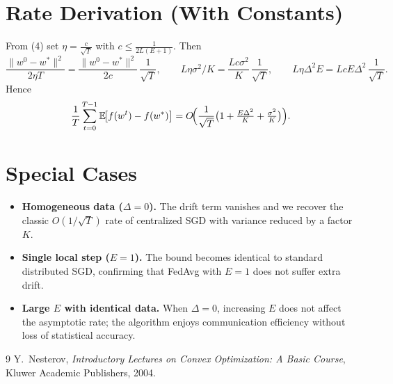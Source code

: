 \documentclass{article}
\newcommand{\E}{\mathbb{E}}
\begin{document}
\section*{Rate Derivation (With Constants)}
From (4) set $\eta = \frac{c}{\sqrt{T}}$ with $c\le \frac{1}{2L(E+1)}$.
Then
\[
\frac{\|w^{0}-w^{*}\|^{2}}{2\eta T}= \frac{\|w^{0}-w^{*}\|^{2}}{2c}\,\frac{1}{\sqrt{T}},\qquad
L\eta\sigma^{2}/K = \frac{Lc\sigma^{2}}{K}\,\frac{1}{\sqrt{T}},\qquad
L\eta\Delta^{2}E = LcE\Delta^{2}\,\frac{1}{\sqrt{T}}.
\]
Hence
\[
\frac{1}{T}\sum_{t=0}^{T-1}\E\!\bigl[f(w^{t})-f(w^{*})\bigr]
= O\!\Bigl(\frac{1}{\sqrt{T}}\bigl(1+\tfrac{E\Delta^{2}}{K}+\tfrac{\sigma^{2}}{K}\bigr)\Bigr).
\]

\section*{Special Cases}
\begin{itemize}[leftmargin=*]
  \item \textbf{Homogeneous data ($\Delta=0$).} The drift term vanishes and we recover the classic $O(1/\sqrt{T})$ rate of centralized SGD with variance reduced by a factor $K$.
  \item \textbf{Single local step ($E=1$).} The bound becomes identical to standard distributed SGD, confirming that FedAvg with $E=1$ does not suffer extra drift.
  \item \textbf{Large $E$ with identical data.} When $\Delta=0$, increasing $E$ does not affect the asymptotic rate; the algorithm enjoys communication efficiency without loss of statistical accuracy.
\end{itemize}

\begin{thebibliography}{9}
Y.~Nesterov, \emph{Introductory Lectures on Convex Optimization: A Basic Course}, Kluwer Academic Publishers, 2004.
\end{thebibliography}
\end{document}
